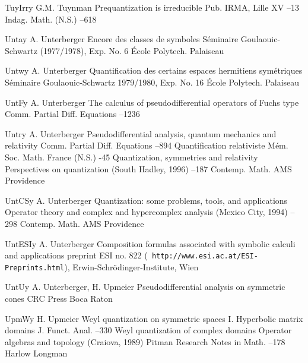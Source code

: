 \documentclass[11pt]{amsart}
\numberwithin{equation}{section}
\theoremstyle{remark}
\newcommand{\by}{\mathbf y}
\begin{document}
\begin{thebibliography}{199}
 TuyIrr\by{ G.M. Tuynman \paper Prequantization is irreducible \jour
Pub. IRMA, Lille   \issue  XV --13 \moreref \jour Indag.
Math. (N.S.)   --618}

 Unta\by{ A. Unterberger \paper Encore des classes de symboles \inbook
S\'eminaire Goulaouic-Schwartz (1977/1978), Exp. No. 6 \publ \'Ecole Polytech.
\publaddr Palaiseau }

 Untw\by{ A. Unterberger \paper Quantification des certains espaces
hermitiens sym\'etriques \inbook S\'eminaire Goulaouic-Schwartz 1979/1980, Exp.
No. 16 \publ \'Ecole Polytech. \publaddr Palaiseau }

 UntF\by{ A. Unterberger \paper The calculus of pseudodifferential
operators of Fuchs type \jour Comm. Partial Diff. Equations  
--1236}

 Untr\by{ A. Unterberger \paper Pseudodifferential analysis, quantum
mechanics and relativity \jour Comm. Partial Diff. Equations  
--894 \moreref \paper Quantification relativiste \jour M\'em. Soc.
Math. France (N.S.) -45  \moreref \paper Quantization,
symmetries and relativity \inbook Perspectives on quantization (South Hadley,
1996) --187 \bookinfo Contemp. Math.  \publ AMS \publaddr
Providence }

 UntCS\by{ A. Unterberger \paper Quantization: some problems, tools, and
applications \inbook Operator theory and complex and hypercomplex analysis
(Mexico City, 1994) --298 \bookinfo Contemp. Math.  \publ AMS
\publaddr Providence }

 UntESI\by{ A. Unterberger \paper Composition formulas associated with
symbolic calculi and applications \paperinfo preprint ESI no. 822 ({\tt
http://www.esi.ac.at/ESI-Preprints.html}), Erwin-Schr\"odinger-Institute, Wien
}

 UntU\by{ A. Unterberger, H. Upmeier \book Pseudodifferential analysis on
symmetric cones \publ CRC Press \publaddr Boca Raton }

 UpmW\by{ H. Upmeier \paper Weyl quantization on symmetric spaces I.
Hyperbolic matrix domains \jour J. Funct. Anal.   --330 \moreref \paper Weyl quantization of complex domains \inbook Operator
algebras and topology (Craiova, 1989) \bookinfo Pitman Research Notes in Math.
 --178 \publaddr Harlow \publ Longman }


\end{thebibliography}
\end{document}
